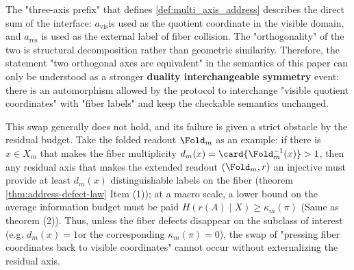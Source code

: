 \begin{remark}\label{rem:xi-dual-swap-symmetry-defect}
The "three-axis prefix" that defines \ref{def:multi_axis_address} describes the direct sum of the interface: \(a_{\mathrm{vis}}\) ​​is used as the quotient coordinate in the visible domain, and \(a_{\mathrm{res}}\) is used as the external label of fiber collision. The "orthogonality" of the two is structural decomposition rather than geometric similarity.
Therefore, the statement "two orthogonal axes are equivalent" in the semantics of this paper can only be understood as a stronger \textbf{duality interchangeable symmetry} event: there is an automorphism allowed by the protocol to interchange "visible quotient coordinates" with "fiber labels" and keep the checkable semantics unchanged.
\par
This swap generally does not hold, and its failure is given a strict obstacle by the residual budget.
Take the folded readout \(\Fold_m\) as an example: if there is \(x\in X_m\) that makes the fiber multiplicity \(d_m(x)=\card{\Fold_m^{-1}(x)}>1\), then any residual axis that makes the extended readout \((\Fold_m,r)\) an injective must provide at least \(d_m(x)\) distinguishable labels on the fiber (theorem \ref{thm:address-defect-law} Item (1)); at a macro scale, a lower bound on the average information budget must be paid \(H(r(A)\mid X)\ge \kappa_m(\pi)\) (Same as theorem (2)).
Thus, unless the fiber defects disappear on the subclass of interest (e.g. \(d_m(x)=1\) ​​or the corresponding \(\kappa_m(\pi)=0\)), the swap of "pressing fiber coordinates back to visible coordinates" cannot occur without externalizing the residual axis.
\end{remark}
